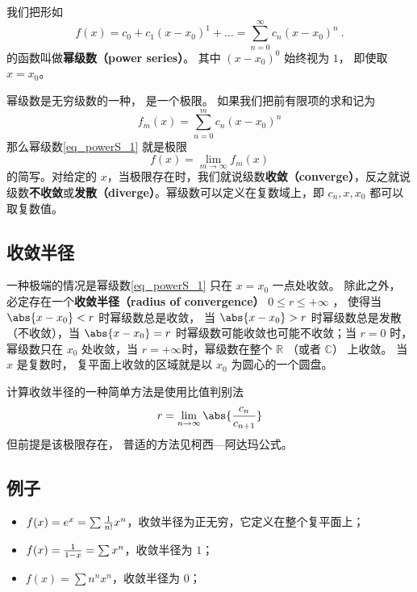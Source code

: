 

我们把形如
\begin{equation}\label{eq_powerS_1}
f(x) = c_0 + c_1 (x - x_0)^1 + \dots = \sum_{n=0}^\infty c_n (x-x_0)^n~.
\end{equation}
的函数叫做\textbf{幂级数（power series）}。 其中 $(x - x_0)^0$ 始终视为 $1$， 即使取 $x = x_0$。

幂级数是无穷级数的一种， 是一个极限。 如果我们把前有限项的求和记为
\begin{equation}
f_m(x) = \sum_{n=0}^m c_n (x-x_0)^n
\end{equation}
那么幂级数\autoref{eq_powerS_1} 就是极限
\begin{equation}
f(x) = \lim_{m\to\infty} f_m(x)
\end{equation}
的简写。对给定的 $x$，当极限存在时，我们就说级数\textbf{收敛（converge）}，反之就说级数\textbf{不收敛}或\textbf{发散（diverge）}。幂级数可以定义在复数域上，即 $c_n, x, x_0$ 都可以取复数值。

\subsection{收敛半径}
一种极端的情况是幂级数\autoref{eq_powerS_1} 只在 $x = x_0$ 一点处收敛。 除此之外， 必定存在一个\textbf{收敛半径（radius of convergence）} $0 \leq r \leq +\infty$ ， 使得当 $\abs{x-x_0} < r$ 时幂级数总是收敛， 当 $\abs{x-x_0} > r$ 时幂级数总是发散（不收敛），当 $\abs{x - x_0} = r$ 时幂级数可能收敛也可能不收敛；当 $r = 0$ 时，幂级数只在 $x_0$ 处收敛，当 $r = + \infty$时，幂级数在整个 $\mathbb{R}$ （或者 $\mathbb{C}$） 上收敛。 当 $x$ 是复数时， 复平面上收敛的区域就是以 $x_0$ 为圆心的一个圆盘。

计算收敛半径的一种简单方法是使用比值判别法
\begin{equation}
r = \lim_{n \to \infty} \abs{\frac{c_n}{c_{n+1}}}
\end{equation}
但前提是该极限存在， 普适的方法见柯西—阿达玛公式。

\subsection{例子}
\begin{example}{}
\begin{itemize}
\item $f(x) = e^x = \sum {1 \over n!} x^n$，收敛半径为正无穷，它定义在整个复平面上；
\item $f(x) = {1 \over 1 - x} = \sum x^n$，收敛半径为 $1$；
\item $f(x) = \sum n^n x^n$，收敛半径为 $0$；
\end{itemize}
\end{example}
